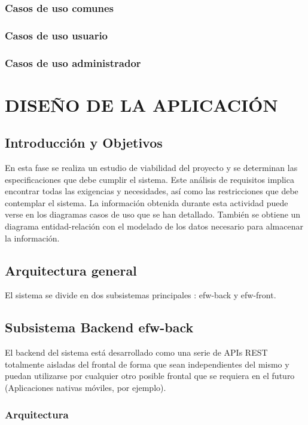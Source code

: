 \documentclass[12pt, a4paper, twoside]{book}
\begin{document}
	\subsection{Casos de uso comunes}
	\subsection{Casos de uso usuario}
	\subsection{Casos de uso administrador}
	\chapter{DISEÑO DE LA APLICACIÓN}
	\section{Introducción y Objetivos}
	En esta fase se realiza un estudio de viabilidad del proyecto y se determinan las especificaciones que debe cumplir el sistema. Este análisis de requisitos implica encontrar todas las exigencias y necesidades, así como las restricciones que debe contemplar el sistema. La información obtenida durante esta actividad puede verse en los diagramas casos de uso que se han detallado. También se obtiene un diagrama entidad-relación con el modelado de los datos necesario para almacenar la información.	
	\section{Arquitectura general}
	
	El sistema se divide en dos subsistemas principales : efw-back y efw-front.
	
	\section{Subsistema Backend efw-back}
	
	El backend del sistema está desarrollado como una serie de APIs REST totalmente aisladas del frontal de forma que sean independientes del mismo y puedan utilizarse por cualquier otro posible frontal que se requiera en el futuro (Aplicaciones nativas móviles, por ejemplo).
	
	\subsection{Arquitectura}
	
\end{document}
